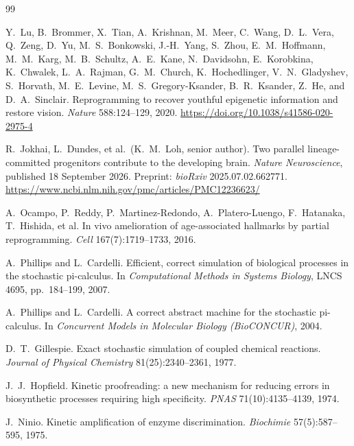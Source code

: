 \documentclass[11pt,a4paper]{article}
\theoremstyle{plain}
\theoremstyle{definition}
\theoremstyle{remark}
\begin{document}
\begin{thebibliography}{99}\raggedright

Y.~Lu, B.~Brommer, X.~Tian, A.~Krishnan, M.~Meer, C.~Wang, D.~L.~Vera,
Q.~Zeng, D.~Yu, M.~S.~Bonkowski, J.-H.~Yang, S.~Zhou, E.~M.~Hoffmann,
M.~M.~Karg, M.~B.~Schultz, A.~E.~Kane, N.~Davidsohn, E.~Korobkina,
K.~Chwalek, L.~A.~Rajman, G.~M.~Church, K.~Hochedlinger, V.~N.~Gladyshev,
S.~Horvath, M.~E.~Levine, M.~S.~Gregory-Ksander, B.~R.~Ksander, Z.~He, and
D.~A.~Sinclair.
\newblock Reprogramming to recover youthful epigenetic information and restore
vision.
\newblock \emph{Nature} 588:124--129, 2020.
\newblock \url{https://doi.org/10.1038/s41586-020-2975-4}

R.~Jokhai, L.~Dundes, et al.\ (K.~M.~Loh, senior author).
\newblock Two parallel lineage-committed progenitors contribute to the
developing brain.
\newblock \emph{Nature Neuroscience}, published 18 September 2026.
\newblock Preprint: \emph{bioRxiv} 2025.07.02.662771.
\newblock \url{https://www.ncbi.nlm.nih.gov/pmc/articles/PMC12236623/}

A.~Ocampo, P.~Reddy, P.~Martinez-Redondo, A.~Platero-Luengo, F.~Hatanaka,
T.~Hishida, et al.
\newblock In vivo amelioration of age-associated hallmarks by partial
reprogramming.
\newblock \emph{Cell} 167(7):1719--1733, 2016.

A.~Phillips and L.~Cardelli.
\newblock Efficient, correct simulation of biological processes in the
stochastic pi-calculus.
\newblock In \emph{Computational Methods in Systems Biology}, LNCS 4695,
pp.~184--199, 2007.

A.~Phillips and L.~Cardelli.
\newblock A correct abstract machine for the stochastic pi-calculus.
\newblock In \emph{Concurrent Models in Molecular Biology (BioCONCUR)}, 2004.

D.~T.~Gillespie.
\newblock Exact stochastic simulation of coupled chemical reactions.
\newblock \emph{Journal of Physical Chemistry} 81(25):2340--2361, 1977.

J.~J.~Hopfield.
\newblock Kinetic proofreading: a new mechanism for reducing errors in
biosynthetic processes requiring high specificity.
\newblock \emph{PNAS} 71(10):4135--4139, 1974.

J.~Ninio.
\newblock Kinetic amplification of enzyme discrimination.
\newblock \emph{Biochimie} 57(5):587--595, 1975.


\end{thebibliography}
\end{document}
